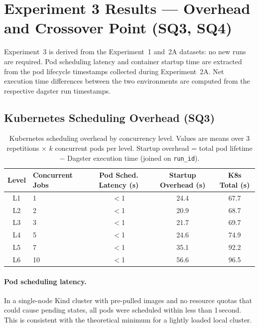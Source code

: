 
\section{Experiment 3 Results --- Overhead and Crossover Point (SQ3, SQ4)}
\label{sec:results-exp3}

Experiment~3 is derived from the Experiment~1 and~2A datasets: no new runs are required.
Pod scheduling latency and container startup time are extracted from the pod lifecycle timestamps collected during Experiment~2A.
Net execution time differences between the two environments are computed from the respective dagster run timestamps.

\subsection{Kubernetes Scheduling Overhead (SQ3)}
\label{subsec:results-overhead}

\begin{table}[H]
  \centering
  \caption{Kubernetes scheduling overhead by concurrency level.
  Values are means over 3 repetitions $\times$ $k$ concurrent pods per level.
  Startup overhead = total pod lifetime $-$ Dagster execution time (joined on \texttt{run\_id}).}
  \label{tab:overhead-summary}
  \small
  \begin{tabular}{clccc}
    \toprule
    \textbf{Level} & \textbf{Concurrent Jobs} & \textbf{Pod Sched. Latency (s)} & \textbf{Startup Overhead (s)} & \textbf{K8s Total (s)} \\
    \midrule
    L1  & 1  & $<$1 & 24.4 & 67.7 \\
    L2  & 2  & $<$1 & 20.9 & 68.7 \\
    L3  & 3  & $<$1 & 21.7 & 69.7 \\
    L4  & 5  & $<$1 & 24.6 & 74.9 \\
    L5  & 7  & $<$1 & 35.1 & 92.2 \\
    L6  & 10 & $<$1 & 56.6 & 96.5 \\
    \bottomrule
  \end{tabular}
\end{table}

\paragraph{Pod scheduling latency.}
In a single-node Kind cluster with pre-pulled images and no resource quotas that could cause pending states, all pods were scheduled within less than 1\,second.
This is consistent with the theoretical minimum for a lightly loaded local cluster.

